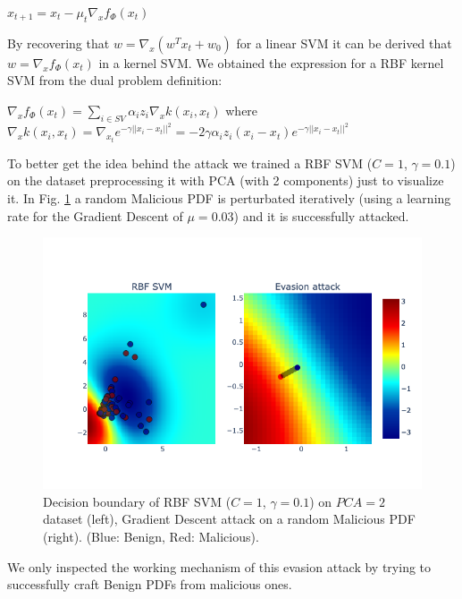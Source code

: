 \documentclass[twocolumn, switch]{article} %
\newcommand\x{0.7}
\begin{document}
\begin{center}
	$x_{t+1} = x_t - \mu_t\nabla_xf_{\Phi}(x_t)$
\end{center}
By recovering that $w = \nabla_x(w^Tx_t+w_0)$ for a linear SVM it can be derived that $w = \nabla_xf_{\Phi}(x_t)$ in a kernel SVM.
We obtained the expression for a RBF kernel SVM from the dual problem definition:
\begin{center}
	$\nabla_xf_{\Phi}(x_t) = \sum_{i \in SV}^{}\alpha_iz_i\nabla_xk(x_i,x_t)$
	where $\nabla_xk(x_i,x_t) = \nabla_{x_t}e^{-\gamma||x_i-x_t||^2}=-2\gamma\alpha_i z_i(x_i - x_t)e^{-\gamma||x_i-x_t||^2}$
\end{center}
To better get the idea behind the attack we trained a RBF SVM ($C=1$, $\gamma=0.1$) on the dataset preprocessing it with PCA (with 2 components) just to visualize it. In Fig. \ref{fig:svmattack} a random Malicious PDF is perturbated iteratively (using a learning rate for the Gradient Descent of $\mu=0.03$) and it is successfully attacked.
\begin{figure}[ht!]
	\centering
	\includegraphics[width=\x\linewidth]{svmattack.png}
	\caption{Decision boundary of RBF SVM ($C=1$, $\gamma=0.1$) on $PCA=2$ dataset (left), Gradient Descent attack on a random Malicious PDF (right). (Blue: Benign, Red: Malicious).}
	\label{fig:svmattack}
\end{figure}
We only inspected the working mechanism of this evasion attack by trying to successfully craft Benign PDFs from malicious ones.
\end{document}
